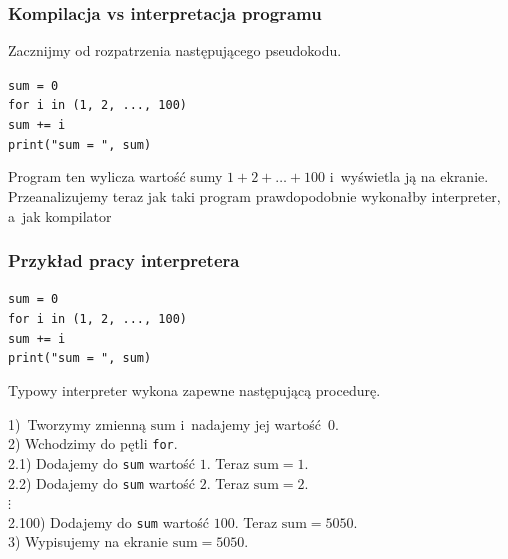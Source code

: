 \documentclass[10pt,t]{beamer}
\begin{document}
\begin{frame}
  \frametitle{Kompilacja vs interpretacja programu}


  Zacznijmy od rozpatrzenia następującego pseudokodu.

  \texttt{sum = 0} \\

  \texttt{for i in (1, 2, ..., 100)} \\
  \hphantom{aaaa} \texttt{sum += i} \\

  \texttt{print("sum = ", sum)}

  Program ten wylicza wartość sumy $1 + 2 + \ldots + 100$ i~wyświetla ją na
  ekranie. Przeanalizujemy teraz jak taki program prawdopodobnie wykonałby
  interpreter, a~jak kompilator

\end{frame}





\begin{frame}
  \frametitle{Przykład pracy interpretera}


  \texttt{sum = 0} \\

  \texttt{for i in (1, 2, ..., 100)} \\
  \hphantom{aaaa} \texttt{sum += i} \\

  \texttt{print("sum = ", sum)}

  Typowy interpreter wykona zapewne następującą procedurę.

  1)~Tworzymy zmienną \texttt{$\text{sum}$} i~nadajemy jej wartość~$0$. \\
  2) Wchodzimy do pętli \texttt{for}. \\
  2.1) Dodajemy do \texttt{sum} wartość $1$. Teraz $\text{sum} = 1$. \\
  2.2) Dodajemy do \texttt{sum} wartość $2$. Teraz $\text{sum} = 2$. \\
  \hphantom{aaa} $\vdots$ \\
  2.100) Dodajemy do \texttt{sum} wartość $100$. Teraz
  \texttt{$\text{sum} = 5050$}. \\
  3) Wypisujemy na ekranie \texttt{$\text{sum} = 5050$}.

\end{frame}
\end{document}
